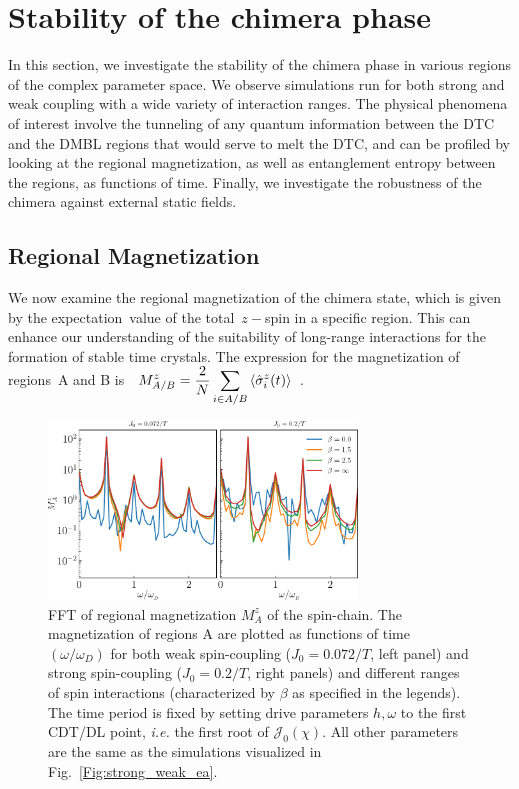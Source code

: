 \documentclass[%
nofootinbib,
reprint,
superscriptaddress,
amsmath,amssymb,showkeys,
aps,
prb,
]{revtex4-2}
\begin{document}
	\section{\label{sec:level4} Stability of the chimera phase}
	In this section, we investigate the stability of the chimera phase in various regions of the complex parameter space. We observe simulations run for both strong and weak coupling with a wide variety of interaction ranges. The physical phenomena of interest involve the tunneling of any quantum information between the DTC and the DMBL regions that would serve to melt the DTC, and can be profiled by looking at the regional magnetization, as well as entanglement entropy between the regions, as functions of time. Finally, we investigate the robustness of the chimera against external static fields.
	
	\subsection{\label{sec:level42} Regional Magnetization}
	
	We now examine the regional magnetization of the chimera state, which is given by the expectation value of the total $z-$spin in a specific region. This can enhance our understanding of the suitability of long-range interactions for the formation of stable time crystals. The expression for the magnetization of regions A and B is  $\displaystyle M^z_{A/B}=\frac{2}{N}\sum_{i\in{A/B}}\expval{\hat{\sigma}^z_i(t)}$~\cite{sakurai_phys_nodate}.

\begin{figure}
	\centering
	\includegraphics[width = 8.2cm]{sz_fft.pdf}
	\caption{FFT of regional magnetization $M^z_{A}$ of the spin-chain. The magnetization of regions A are plotted  as functions of time $(\omega/\omega_D)$ for both weak spin-coupling ($J_0=0.072/T$, left panel) and strong spin-coupling ($J_0=0.2/T$, right panels) and different ranges of spin interactions (characterized by $\beta$ as specified in the legends). The time period is fixed by setting drive parameters $h,\omega$ to the first CDT/DL point, \textit{i.e.} the first root of $\mathcal{J}_0(\chi)$. All other parameters are the same as the simulations visualized in Fig.~\ref{Fig:strong_weak_ea}.}
	\label{Fig:regionalFFT}
\end{figure}
\end{document}
